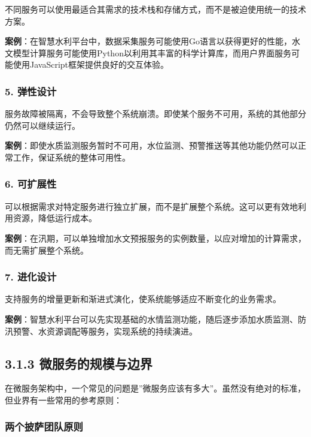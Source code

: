 不同服务可以使用最适合其需求的技术栈和存储方式，而不是被迫使用统一的技术方案。

\textbf{案例}：在智慧水利平台中，数据采集服务可能使用Go语言以获得更好的性能，水文模型计算服务可能使用Python以利用其丰富的科学计算库，而用户界面服务可能使用JavaScript框架提供良好的交互体验。

\subsubsection{5. 弹性设计}\label{ux5f39ux6027ux8bbeux8ba1}

服务故障被隔离，不会导致整个系统崩溃。即使某个服务不可用，系统的其他部分仍然可以继续运行。

\textbf{案例}：即使水质监测服务暂时不可用，水位监测、预警推送等其他功能仍然可以正常工作，保证系统的整体可用性。

\subsubsection{6. 可扩展性}\label{ux53efux6269ux5c55ux6027}

可以根据需求对特定服务进行独立扩展，而不是扩展整个系统。这可以更有效地利用资源，降低运行成本。

\textbf{案例}：在汛期，可以单独增加水文预报服务的实例数量，以应对增加的计算需求，而无需扩展整个系统。

\subsubsection{7. 进化设计}\label{ux8fdbux5316ux8bbeux8ba1}

支持服务的增量更新和渐进式演化，使系统能够适应不断变化的业务需求。

\textbf{案例}：智慧水利平台可以先实现基础的水情监测功能，随后逐步添加水质监测、防汛预警、水资源调配等服务，实现系统的持续演进。

\subsection{3.1.3
微服务的规模与边界}\label{ux5faeux670dux52a1ux7684ux89c4ux6a21ux4e0eux8fb9ux754c}

在微服务架构中，一个常见的问题是''微服务应该有多大''。虽然没有绝对的标准，但业界有一些常用的参考原则：

\subsubsection{两个披萨团队原则}\label{ux4e24ux4e2aux62abux8428ux56e2ux961fux539fux5219}

